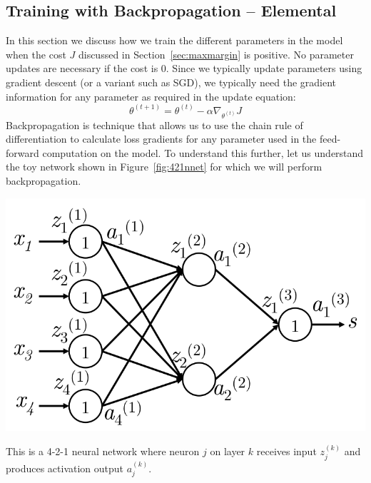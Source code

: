 \documentclass{tufte-handout}
\begin{document}
\subsection{Training with Backpropagation -- Elemental}\label{sec:backprop1}
In this section we discuss how we train the different parameters in the model when the cost $J$ discussed in Section~\ref{sec:maxmargin} is positive. No parameter updates are necessary if the cost is $0$. Since we typically update parameters using gradient descent (or a variant such as SGD), we typically need the gradient information for any parameter as required in the update equation:
$$ \theta^{(t+1)} = \theta^{(t)} - \alpha \nabla_{\theta^{(t)}}J$$
Backpropagation is technique that allows us to use the chain rule of differentiation to calculate loss gradients for any parameter used in the feed-forward computation on the model. To understand this further, let us understand the toy network shown in Figure~\ref{fig:421nnet} for which we will perform backpropagation.
\begin{marginfigure}%
  \includegraphics[width=\linewidth]{421nnet}
  \caption{This is a 4-2-1 neural network where neuron $j$ on layer $k$ receives input $z_{j}^{(k)}$ and produces activation output $a_{j}^{(k)}$.}
  \label{fig:421nnet}
\end{marginfigure}
\end{document}
